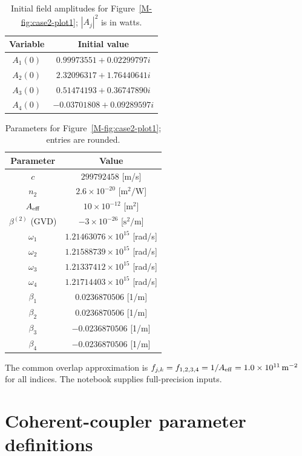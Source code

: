 \documentclass[11pt,a4paper]{article}
\begin{document}
\begin{table}[H]\centering
\caption{Initial field amplitudes for Figure~\ref*{M-fig:case2-plot1}; $|A_j|^2$ is in watts.}
\label{tab:case2-init}
\begin{tabular}{cc}\hline Variable & Initial value \\ \hline
$A_1(0)$ & $0.99973551+0.02299797i$ \\
$A_2(0)$ & $2.32096317+1.76440641i$ \\
$A_3(0)$ & $0.51474193+0.36747890i$ \\
$A_4(0)$ & $-0.03701808+0.09289597i$ \\
\hline\end{tabular}\end{table}
\begin{table}[H]\centering
\caption{Parameters for Figure~\ref*{M-fig:case2-plot1}; entries are rounded.}
\label{tab:case2-physical}
\begin{tabular}{cc}\hline Parameter & Value \\ \hline
$c$ & $299792458$ [m/s] \\
$n_2$ & $2.6\times10^{-20}$ [$\mathrm m^2/\mathrm W$] \\
$A_{\rm eff}$ & $10\times10^{-12}$ [$\mathrm m^2$] \\
$\beta^{(2)}$ (GVD) & $-3\times10^{-26}$ [$\mathrm s^2/\mathrm m$] \\
$\omega_1$ & $1.21463076\times10^{15}$ [rad/s] \\
$\omega_2$ & $1.21588739\times10^{15}$ [rad/s] \\
$\omega_3$ & $1.21337412\times10^{15}$ [rad/s] \\
$\omega_4$ & $1.21714403\times10^{15}$ [rad/s] \\
$\beta_1$ & $0.0236870506$ [1/m] \\
$\beta_2$ & $0.0236870506$ [1/m] \\
$\beta_3$ & $-0.0236870506$ [1/m] \\
$\beta_4$ & $-0.0236870506$ [1/m] \\
\hline\end{tabular}\end{table}
The common overlap approximation is $f_{j,k}=f_{1,2,3,4}=1/A_{\rm eff}=1.0\times10^{11}\,\mathrm m^{-2}$ for all indices.
The notebook supplies full-precision inputs.

\section{Coherent-coupler parameter definitions}
\label{cc:app:param-def-appendix}
\end{document}

